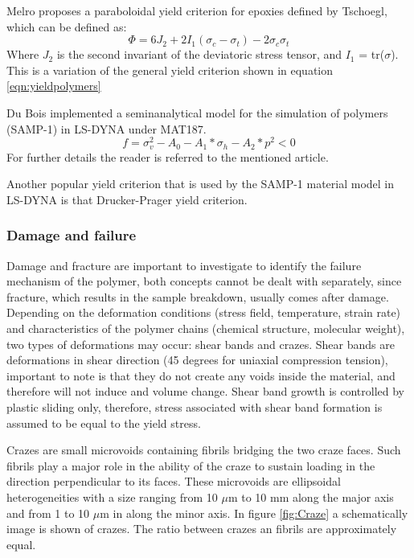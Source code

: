 Melro \cite{Melro2013MicromechanicalModelling} proposes a paraboloidal yield criterion for epoxies defined by Tschoegl, which can be defined as:
\begin{equation}\label{eqn:Tschoegl}
\Phi=6J_2+2I_1(\sigma_c-\sigma_t)-2\sigma_c\sigma_t
\end{equation}Where $J_2$ is the second invariant of the deviatoric stress tensor, and $I_1$ = tr(\textbf{$\sigma$}). This is a variation of the general yield criterion shown in equation \ref{eqn:yieldpolymers}

Du Bois \cite{DuBois2006APolymers} implemented a seminanalytical model for the simulation of polymers (SAMP-1) in LS-DYNA under MAT187. 
\begin{equation}\label{AzziTsai}
f=\sigma_v^2-A_0-A_1*\sigma_h-A_2*p^2<0
\end{equation}For further details the reader is referred to the mentioned article. 

Another popular yield criterion that is used by the SAMP-1 material model in LS-DYNA is that Drucker-Prager yield criterion. 

\subsubsection{Damage and failure}
Damage and fracture are important to investigate to identify the failure mechanism of the polymer, both concepts cannot be dealt with separately, since fracture, which results in the sample breakdown, usually comes after damage. Depending on the deformation conditions (stress field, temperature, strain rate) and characteristics of the polymer chains (chemical structure, molecular weight), two types of deformations may occur: shear bands and crazes. Shear bands are deformations in shear direction (45 degrees for uniaxial compression tension), important to note is that they do not create any voids inside the material, and therefore will not induce and volume change. Shear band growth is controlled by plastic sliding only, therefore, stress associated with shear band formation is assumed to be equal to the yield stress. 

Crazes are small microvoids containing fibrils bridging the two craze faces. Such fibrils play a major role in the ability of the craze to sustain loading in the direction perpendicular to its faces. These microvoids are ellipsoidal heterogeneities with a size ranging from 10 $\mu$m to 10 mm along the major axis and from 1 to 10 $\mu$m in along the minor axis. In figure \ref{fig:Craze} a schematically image is shown of crazes. The ratio between crazes an fibrils are approximately equal.  

